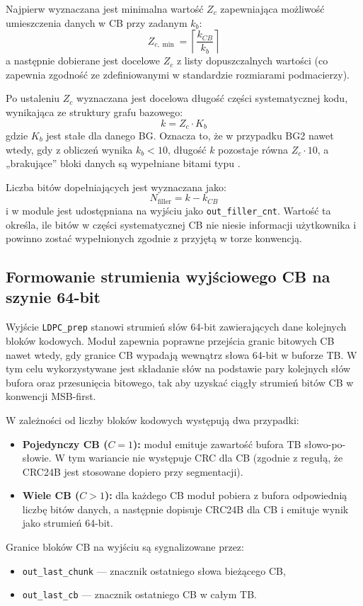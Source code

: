 Najpierw wyznaczana jest minimalna wartość $Z_c$ zapewniająca możliwość umieszczenia danych w CB przy zadanym $k_b$:
\[
Z_{c,\min} = \left\lceil \frac{k_{CB}}{k_b} \right\rceil
\]
a następnie dobierane jest docelowe $Z_c$ z listy dopuszczalnych wartości (co zapewnia zgodność ze zdefiniowanymi w standardzie rozmiarami podmacierzy).

Po ustaleniu $Z_c$ wyznaczana jest docelowa długość części systematycznej kodu, wynikająca ze struktury grafu bazowego:
\[
k = Z_c \cdot K_b
\]
gdzie $K_b$ jest stałe dla danego BG. Oznacza to, że w przypadku BG2 nawet wtedy, gdy z obliczeń wynika $k_b < 10$, długość $k$ pozostaje równa $Z_c \cdot 10$, a „brakujące” bloki danych są wypełniane bitami typu .

Liczba bitów dopełniających jest wyznaczana jako:
\[
N_\mathrm{filler} = k - k_{CB}
\]
i w module jest udostępniana na wyjściu jako \texttt{out\_filler\_cnt}. Wartość ta określa, ile bitów w części systematycznej CB nie niesie informacji użytkownika i powinno zostać wypełnionych zgodnie z przyjętą w torze konwencją.


\subsection{Formowanie strumienia wyjściowego CB na szynie 64-bit}
\label{subsec:ldpc_prep_streaming}

Wyjście \texttt{LDPC\_prep} stanowi strumień słów 64-bit zawierających dane kolejnych bloków kodowych. Moduł zapewnia poprawne przejścia granic bitowych CB nawet wtedy, gdy granice CB wypadają wewnątrz słowa 64-bit w buforze TB. W tym celu wykorzystywane jest składanie słów na podstawie pary kolejnych słów bufora oraz przesunięcia bitowego, tak aby uzyskać ciągły strumień bitów CB w konwencji MSB-first.

W zależności od liczby bloków kodowych występują dwa przypadki:
\begin{itemize}
  \item \textbf{Pojedynczy CB ($C=1$):} moduł emituje zawartość bufora TB słowo-po-słowie. W tym wariancie nie występuje CRC dla CB (zgodnie z regułą, że CRC24B jest stosowane dopiero przy segmentacji).
  \item \textbf{Wiele CB ($C>1$):} dla każdego CB moduł pobiera z bufora odpowiednią liczbę bitów danych, a następnie dopisuje CRC24B dla CB i emituje wynik jako strumień 64-bit.
\end{itemize}

Granice bloków CB na wyjściu są sygnalizowane przez:
\begin{itemize}
  \item \texttt{out\_last\_chunk} --- znacznik ostatniego słowa bieżącego CB,
  \item \texttt{out\_last\_cb} --- znacznik ostatniego CB w całym TB.
\end{itemize}

